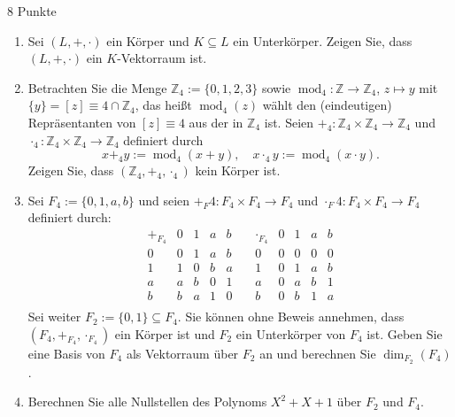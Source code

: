 \documentclass{../problemset}
\begin{document}
\begin{problem}{8 Punkte}
\begin{enumerate}
	\item Sei $(L, +, \cdot)$ ein Körper und $K \subseteq L$ ein Unterkörper. Zeigen Sie, dass $(L, +, \cdot)$ ein $K$-Vektorraum ist.
	\item Betrachten Sie die Menge $\mathbb{Z}_4 := \{0, 1, 2, 3\}$ sowie $\operatorname{mod}_4 : \mathbb{Z} \to \mathbb{Z}_4$, $z \mapsto y$ mit $\{y\} = [z] \equiv 4 \cap \mathbb{Z}_4$, das heißt $\operatorname{mod}_4(z)$ wählt den (eindeutigen) Repräsentanten von $[z] \equiv 4$ aus der in $\mathbb{Z}_4$ ist. Seien $+_4 : \mathbb{Z}_4 \times \mathbb{Z}_4 \to \mathbb{Z}_4$ und $\cdot_4 : \mathbb{Z}_4 \times \mathbb{Z}_4 \to \mathbb{Z}_4$ definiert durch
	      \[ x +_4 y := \operatorname{mod}_4(x + y), \quad x \cdot_4 y := \operatorname{mod}_4(x \cdot y). \]
	      Zeigen Sie, dass $(\mathbb{Z}_4, +_4, \cdot_4)$ kein Körper ist.
	\item Sei $F_4 := \{0, 1, a, b\}$ und seien $+_F4 : F_4 \times F_4 \to F_4$ und $\cdot_F4 : F_4 \times F_4 \to F_4$ definiert durch:
	      \[ \begin{array}{c|cccc}
			      +_{F_4} & 0 & 1 & a & b \\
			      \hline
			      0       & 0 & 1 & a & b \\
			      1       & 1 & 0 & b & a \\
			      a       & a & b & 0 & 1 \\
			      b       & b & a & 1 & 0 \\
		      \end{array} \quad
		      \begin{array}{c|cccc}
			      \cdot_{F_4} & 0 & 1 & a & b \\
			      \hline
			      0           & 0 & 0 & 0 & 0 \\
			      1           & 0 & 1 & a & b \\
			      a           & 0 & a & b & 1 \\
			      b           & 0 & b & 1 & a \\
		      \end{array} \]
	      Sei weiter $F_2 := \{0, 1\} \subseteq F_4$. Sie können ohne Beweis annehmen, dass $(F_4, +_{F_4}, \cdot_{F_4})$ ein Körper ist und $F_2$ ein Unterkörper von $F_4$ ist. Geben Sie eine Basis von $F_4$ als Vektorraum über $F_2$ an und berechnen Sie $\dim_{F_2}(F_4)$.
	\item Berechnen Sie alle Nullstellen des Polynoms $X^2 + X + 1$ über $F_2$ und $F_4$.
\end{enumerate}
\end{problem}
\end{document}
